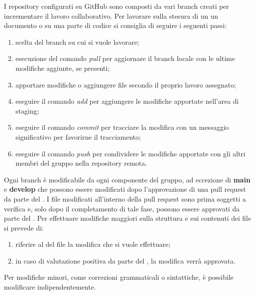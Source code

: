 I repository configurati su GitHub sono composti da vari branch creati per incrementare il lavoro collaborativo. Per lavorare sulla stesura di un un documento o su una parte di codice si consiglia di seguire i seguenti passi:
\begin{enumerate}
	\item scelta del branch su cui si vuole lavorare;
	\item esecuzione del comando \textit{pull} per aggiornare il branch locale con le ultime modifiche aggiunte, se presenti;
	\item apportare modifiche o aggiungere file secondo il proprio lavoro assegnato;
	\item eseguire il comando \textit{add} per aggiungere le modifiche apportate nell'area di staging;
	\item eseguire il comando \textit{commit} per tracciare la modifica con un messaggio significativo per favorirne il tracciamento;
	\item eseguire il comando \textit{push} per condividere le modifiche apportate con gli altri membri del gruppo nella repository remota.
\end{enumerate}

Ogni branch è modificabile da ogni componente del gruppo, ad eccezione di \textbf{main} e \textbf{develop} che possono essere modificati dopo l'approvazione di una pull request da parte del \respProg. I file modificati all'interno della pull request sono prima soggetti a verifica e, solo dopo il completamento di tale fase, possono essere approvati da parte del \respProg.
Per effettuare modifiche maggiori sulla struttura e sui contenuti dei file si prevede di:
\begin{enumerate}
	\item riferire al \respProg{} del file la modifica che si vuole effettuare;
	\item in caso di valutazione positiva da parte del \respProg, la modifica verrà approvata.
\end{enumerate}
Per modifiche minori, come correzioni grammaticali o sintattiche, è possibile modificare indipendentemente. 



